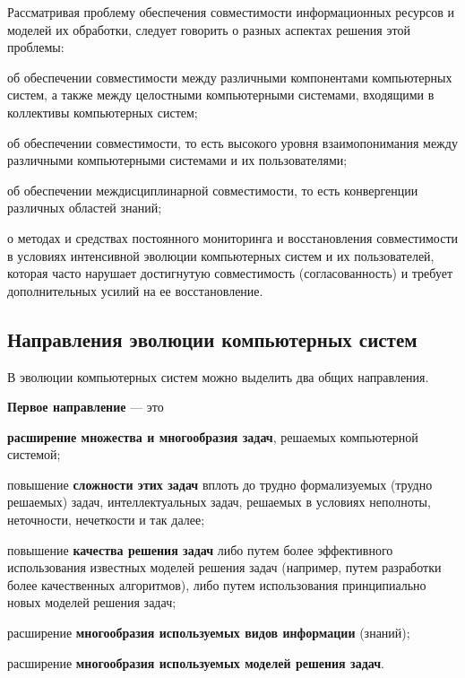 Рассматривая проблему обеспечения совместимости информационных ресурсов и моделей их обработки, следует говорить о разных аспектах решения этой проблемы:
\begin{textitemize}
	\item об обеспечении совместимости между различными компонентами компьютерных систем, а также между целостными компьютерными системами, входящими в коллективы компьютерных систем;
	\item об обеспечении совместимости, то есть высокого уровня взаимопонимания между различными компьютерными системами и их пользователями;
	\item об обеспечении междисциплинарной совместимости, то есть конвергенции различных областей знаний;
	\item о методах и средствах постоянного мониторинга и восстановления совместимости в условиях интенсивной эволюции компьютерных систем и их пользователей, которая часто нарушает достигнутую совместимость (согласованность) и требует дополнительных усилий на ее восстановление.
\end{textitemize}

\subsection{Направления эволюции компьютерных систем}
\label{subsec_directions_evolution_computer_systems}
В эволюции компьютерных систем можно выделить два общих направления.

\textbf{Первое направление} --- это 
\begin{textitemize}
    \item \textbf{расширение множества и многообразия задач}, решаемых компьютерной системой; 
    \item повышение \textbf{сложности этих задач} вплоть до трудно формализуемых (трудно решаемых) задач, интеллектуальных задач, решаемых в условиях неполноты, неточности, нечеткости и так далее;
    \item повышение \textbf{качества решения задач} либо путем более эффективного использования известных моделей решения задач (например, путем разработки более качественных алгоритмов), либо путем использования принципиально новых моделей решения задач;
    \item расширение \textbf{многообразия используемых видов информации} (знаний);
    \item расширение \textbf{многообразия используемых моделей решения задач}.
\end{textitemize}

